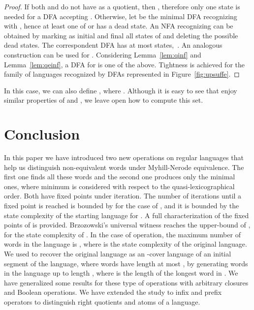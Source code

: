 \documentclass{article}
\newcommand{\dfa}{DFA\xspace}
\newcommand{\nfa}{NFA\xspace}
\newcommand{\dfas}{DFAs\xspace}
\begin{document}
\begin{proof}
 If both  and  do not have  as a quotient, then , 
therefore only one state is needed for a \dfa accepting . 
Otherwise, let  be the minimal \dfa recognizing  with , 
hence at least one of  or  has a dead state.
An \nfa recognizing  can be obtained by marking as initial and final all states of  and deleting the possible dead states.
The correspondent \dfa has at most  states,~\cite{brzozowski14:_quotien_compl_of_closed_languag}. 
An analogous construction can be used for . 
Considering Lemma~\ref{lem:qinf} and Lemma~\ref{lem:qeinf}, a \dfa for  is one of the above. 
Tightness is achieved for the family of languages recognized by \dfas represented in Figure~\ref{fig:upsuffe}.
\end{proof}

In this case, we can also define
,
where 
. Although it is easy to see that  enjoy similar properties of  and , we leave open how to compute this set.



\section{Conclusion}
\label{sconc}


In this paper we have introduced two new operations on regular languages
that help us distinguish non-equivalent words under Myhill-Nerode equivalence.
The first one  finds all these words and the second one 
produces only the minimal ones, where minimum is considered with respect 
to the quasi-lexicographical order.
Both have fixed points under iteration. 
The number of iterations  until a fixed point is reached is bounded by  for
the case of , and it is bounded by the state complexity 
of the starting language for .
A full characterization of the fixed points of  is provided. 
Brzozowski's universal witness  reaches the upper-bound of ,
for the state complexity of .
In the case of  operation, the maximum number of words in 
the language is , where  is the state complexity of the original language.
We used  to recover the original language  as an -cover language of 
an initial segment of the language, where words have length at most , by generating 
words in the language up to length , where  is the length of the 
longest word in .
We have generalized some results for these type of operations with arbitrary closures and 
Boolean operations.
We have extended the study to infix and prefix operators to distinguish right quotients and 
atoms of a language.
\end{document}
